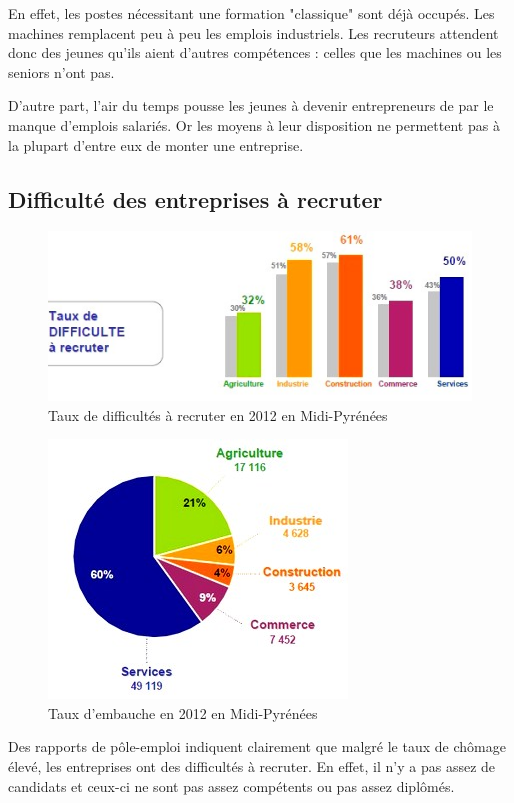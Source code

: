 En effet, les postes nécessitant une formation "classique" sont déjà occupés. Les machines remplacent peu à peu les emplois industriels. Les recruteurs attendent donc des jeunes qu'ils aient d'autres compétences : celles que les machines ou les seniors n'ont pas.

D'autre part, l'air du temps pousse les jeunes à devenir entrepreneurs de par le manque d'emplois salariés. Or les moyens à leur disposition ne permettent pas à la plupart d'entre eux de monter une entreprise.


\subsection{Difficulté des entreprises à recruter}
\begin{figure}[p]
\centering
\includegraphics[trim=7cm 0cm 0cm 0cm, clip=true, scale=1]{../resources/illustrations/diff_recrut}
\caption{Taux de difficultés à recruter en 2012 en Midi-Pyrénées \cite{recrutement_midi_pyr}}
\label{diff_recrut}
\end{figure}
\begin{figure}[p]
\centering
\includegraphics[scale=0.8]{../resources/illustrations/embauches}
\caption{Taux d'embauche en 2012 en Midi-Pyrénées \cite{recrutement_midi_pyr}}
\label{embauche}
\end{figure}
Des rapports de pôle-emploi indiquent clairement que malgré le taux de chômage élevé, les entreprises ont des difficultés à recruter. En effet, il n'y a pas assez de candidats et ceux-ci ne sont pas assez compétents ou pas assez diplômés. 

